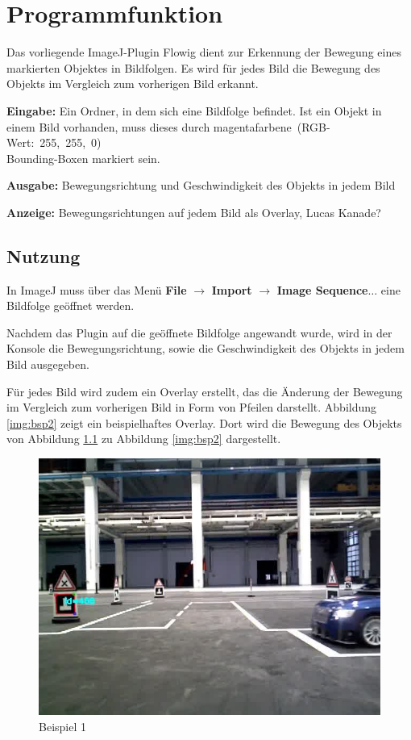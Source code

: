 
\chapter{Programmfunktion}\label{sec:Einleitung}
Das vorliegende ImageJ-Plugin Flowig dient zur Erkennung der Bewegung eines markierten Objektes in Bildfolgen. Es wird für jedes Bild die Bewegung des Objekts im Vergleich zum vorherigen Bild erkannt.

\textbf{Eingabe: } Ein Ordner, in dem sich eine Bildfolge befindet. Ist ein Objekt in einem Bild vorhanden, muss dieses durch magentafarbene~(RGB-Wert:~255,~255,~0)\\Bounding-Boxen markiert sein.


\textbf{Ausgabe: } Bewegungsrichtung und Geschwindigkeit des Objekts in jedem Bild


\textbf{Anzeige: } Bewegungsrichtungen auf jedem Bild als Overlay, Lucas Kanade?


\section{Nutzung}

In ImageJ muss über das Menü \textbf{File} $\rightarrow$ \textbf{Import} $\rightarrow$ \textbf{Image Sequence$\dots$} eine Bildfolge geöffnet werden. 

Nachdem das Plugin auf die geöffnete Bildfolge angewandt wurde, wird in der Konsole die Bewegungsrichtung, sowie die Geschwindigkeit des Objekts in jedem Bild ausgegeben.

Für jedes Bild wird zudem ein Overlay erstellt, das die Änderung der Bewegung im Vergleich zum vorherigen Bild in Form von Pfeilen darstellt. Abbildung \ref{img:bsp2} zeigt ein beispielhaftes Overlay. Dort wird die Bewegung des Objekts von Abbildung \ref{img:bsp1} zu Abbildung \ref{img:bsp2} dargestellt.

\begin{figure}[h]
	\centering
	\includegraphics[scale=0.5]{./Abbildungen/bsp1.jpg}
	\caption{Beispiel 1}
	\label{img:bsp1}
\end{figure}

